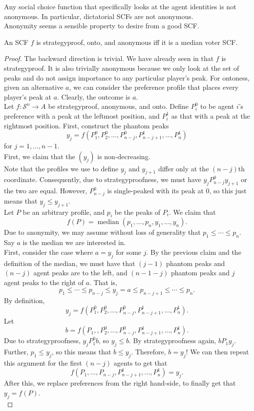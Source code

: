 		Any social choice function that specifically looks at the agent identities is not anonymous. In particular, dictatorial SCFs are not anonymous.\\
		Anonymity seems a sensible property to desire from a good SCF.

		\begin{ftheo}[Moulin 1980]
			An SCF $f$ is strategyproof, onto, and anonymous iff it is a median voter SCF.
		\end{ftheo}
		\begin{proof}
			The backward direction is trivial. We have already seen in  that $f$ is strategyproof. It is also trivially anonymous because we only look at the set of peaks and do not assign importance to any particular player's peak. For ontoness, given an alternative $a$, we can consider the preference profile that places every player's peak at $a$. Clearly, the outcome is $a$.\\

			Let $f : \mathcal{S}^n \to A$ be strategyproof, anonymous, and onto. Define $P_i^0$ to be agent $i$'s preference with a peak at the leftmost position, and $P_i^1$ as that with a peak at the rightmost position. First, construct the phantom peaks
			\[ y_j = f(P_1^0,P_2^0,\ldots,P_{n-j}^0,P_{n-j+1}^1,\ldots,P_n^1) \]
			for $j = 1,\ldots,n-1$.\\
			
			First, we claim that the $(y_j)$ is non-decreasing.\\
			Note that the profiles we use to define $y_j$ and $y_{j+1}$ differ only at the $(n-j)$th coordinate. Consequently, due to strategyproofness, we must have $y_j P_{n-j}^0 y_{j+1}$ or the two are equal. However, $P_{n-j}^0$ is single-peaked with its peak at $0$, so this just means that $y_j \le y_{j+1}$.\\

			Let $P$ be an arbitrary profile, and $p_i$ be the peaks of $P_i$. We claim that
			\[ f(P) = \operatorname{median}(p_1,\ldots,p_n,y_1,\ldots,y_n). \]
			Due to anonymity, we may assume without loss of generality that $p_1 \le \cdots \le p_n$. Say $a$ is the median we are interested in.\\
			
			First, consider the case where $a = y_j$ for some $j$. By the previous claim and the definition of the median, we must have that $(j-1)$ phantom peaks and $(n-j)$ agent peaks are to the left, and $(n-1-j)$ phantom peaks and $j$ agent peaks to the right of $a$. That is,
			\[ p_1 \le \cdots \le p_{n-j} \le y_j = a \le p_{n-j+1} \le \cdots \le p_n. \]
			By definition,
			\[ y_j = f(P_1^0,P_2^0,\ldots,P_{n-j}^0,P_{n-j+1}^1,\ldots,P_n^1). \]
			Let
			\[ b = f(P_1,,P_2^0,\ldots,P_{n-j}^0,P_{n-j+1}^1,\ldots,P_n^1). \]
			Due to strategyproofness, $y_j P_1^0 b$, so $y_j \le b$. By strategyproofness again, $b P_1 y_j$. Further, $p_1 \le y_j$, so this means that $b \le y_j$. Therefore, $b = y_j$! We can then repeat this argument for the first $(n-j)$ agents to get that
			\[ f(P_1,\ldots,P_{n-j},P_{n-j+1}^1,\ldots,P_n^1) = y_j. \]
			After this, we replace preferences from the right hand-side, to finally get that $y_j = f(P)$.\\


\end{proof}
